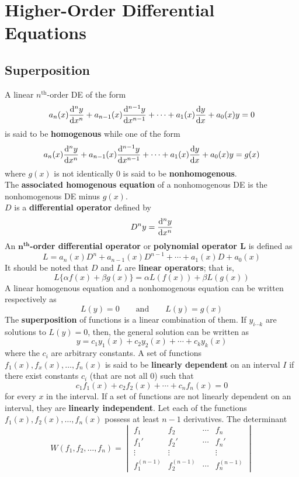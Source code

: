 \documentclass[12pt, A4]{article}
\newcommand{\supt}[2]{#1^{\text{#2}}}
\begin{document}
	\section{Higher-Order Differential Equations}
		\subsection{Superposition}
			A linear \(\supt{n}{th}\)-order DE of the form
				\[a_n(x)\dv[n]{y}{x} + a_{n - 1}(x)\dv[n - 1]{y}{x} + \cdots + a_1(x)\dv{y}{x} + a_0(x)y = 0\]
				is said to be \textbf{homogenous} while one of the form
				\[a_n(x)\dv[n]{y}{x} + a_{n - 1}(x)\dv[n - 1]{y}{x} + \cdots + a_1(x)\dv{y}{x} + a_0(x)y = g(x)\]
				where \(g(x)\) is not identically 0 is said to be \textbf{nonhomogenous}. \\
				The \textbf{associated homogenous equation} of a nonhomogenous DE is the nonhomogenous DE minus \(g(x)\). \\
			\(D\) is a \textbf{differential operator} defined by
				\[D^ny = \dv[n]{y}{x}\]
				An \textbf{\(\bm{\supt{n}{th}}\)-order differential operator} or \textbf{polynomial operator \(\bm{L}\)} is defined as
				\[L = a_n(x)D^n + a_{n - 1}(x)D^{n - 1} + \cdots + a_1(x)D + a_0(x)\]
				It should be noted that \(D\) and \(L\) are \textbf{linear operators}; that is, 
				\[L\{\alpha f(x) + \beta g(x)\} = \alpha L(f(x)) + \beta L(g(x))\]
				A linear homogenous equation and a nonhomogenous equation can be written respectively as
				\[
					L(y) = 0 \qquad \text{and} \qquad
					L(y) = g(x)
				\]
			The \textbf{superposition} of functions is a linear combination of them. If \(y_{i\cdots k}\) are solutions to \(L(y) = 0\), then, the general solution can be written as
				\[y = c_1y_1(x) + c_2y_2(x) + \cdots + c_ky_k(x)\]
				where the \(c_i\) are arbitrary constants.
			A set of functions \(f_1(x), f_x(x), \ldots, f_n(x)\) is said to be \textbf{linearly dependent} on an interval \(I\) if there exist constants \(c_i\) (that are not all 0) such that
				\[c_1f_1(x) + c_2f_2(x) + \cdots + c_nf_n(x) = 0\]
				for every \(x\) in the interval. If a set of functions are not linearly dependent on an interval, they are \textbf{linearly independent}.
			Let each of the functions \(f_1(x), f_2(x), \ldots, f_n(x)\) possess at least \(n - 1\) derivatives. The determinant
				\[
					W(f_1, f_2, \ldots, f_n) = \begin{vmatrix}f_1 & f_2 & \cdots & f_n \\ f_1' & f_2' & \cdots & f_n' \\ \vdots & \vdots && \vdots \\ f_1^{(n - 1)} & f_2^{(n - 1)} & \cdots & f_n^{(n - 1)}\end{vmatrix}
				\]
\end{document}
